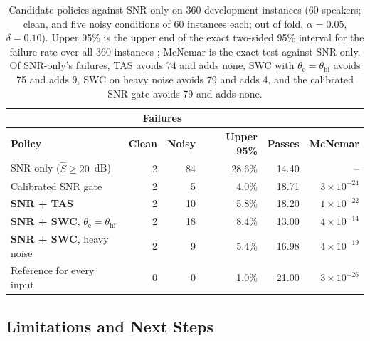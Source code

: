\begin{table}[!htbp]
\centering\small
\caption{Candidate policies against SNR-only on 360 development instances (60 speakers; clean, and five noisy conditions of 60 instances each; out of fold, $\alpha=0.05$, $\delta=0.10$). Upper 95\% is the upper end of the exact two-sided 95\% interval for the failure rate over all 360 instances \parencite{clopper1934}; McNemar is the exact test against SNR-only. Of SNR-only's failures, TAS avoids 74 and adds none, SWC with $\theta_{\mathrm{e}}=\theta_{\mathrm{hi}}$ avoids 75 and adds 9, SWC on heavy noise avoids 79 and adds 4, and the calibrated SNR gate avoids 79 and adds none.}
\label{tab:candidates}
\setlength{\tabcolsep}{4pt}
\begin{tabularx}{\textwidth}{@{}>{\raggedright\arraybackslash}X r r r r r@{}}
\toprule
& \multicolumn{2}{c}{\textbf{Failures}} & & & \\
\cmidrule(lr){2-3}
\textbf{Policy} & \textbf{Clean} & \textbf{Noisy} & \textbf{Upper 95\%} & \textbf{Passes} & \textbf{McNemar} \\
\midrule
SNR-only ($\hat S\ge20$~dB) & 2 & 84 & 28.6\% & 14.40 & -- \\
Calibrated SNR gate & 2 & 5 & 4.0\% & 18.71 & $3{\times}10^{-24}$ \\
\textbf{SNR + TAS} & 2 & 10 & 5.8\% & 18.20 & $1{\times}10^{-22}$ \\
\textbf{SNR + SWC}, $\theta_{\mathrm{e}}=\theta_{\mathrm{hi}}$ & 2 & 18 & 8.4\% & 13.00 & $4{\times}10^{-14}$ \\
\textbf{SNR + SWC}, heavy noise & 2 & 9 & 5.4\% & 16.98 & $4{\times}10^{-19}$ \\
Reference for every input & 0 & 0 & 1.0\% & 21.00 & $3{\times}10^{-26}$ \\
\bottomrule
\end{tabularx}
\end{table}

\subsection{Limitations and Next Steps}
\label{app:cand-limits}

